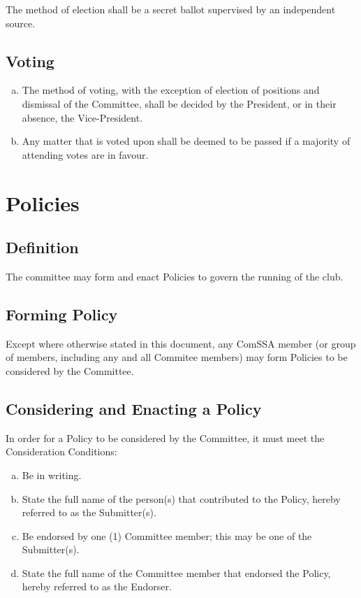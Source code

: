 \documentclass[a4paper,12pt]{article}
\begin{document}
The method of election shall be a secret ballot supervised by an independent source.

\subsection{Voting}

\begin{enumerate}[a)]
	\item The method of voting, with the exception of election of positions and dismissal of the Committee, shall be decided by the President, or in their absence, the Vice-President.
	\item Any matter that is voted upon shall be deemed to be passed if a majority of attending votes are in favour.
\end{enumerate}

\section{Policies}

\subsection{Definition}

The committee may form and enact Policies to govern the running of the club.

\subsection{Forming Policy}

Except where otherwise stated in this document, any ComSSA member (or group of members, including any and all Commitee members) may form Policies to be considered by the Committee.

\subsection{Considering and Enacting a Policy}

In order for a Policy to be considered by the Committee, it must meet the Consideration Conditions:

\begin{enumerate}[a)]
    \item Be in writing.
    \item State the full name of the person(s) that contributed to the Policy, hereby referred to as the Submitter(s).
    \item Be endorsed by one (1) Committee member; this may be one of the Submitter(s).
    \item State the full name of the Committee member that endorsed the Policy, hereby referred to as the Endorser.
\end{enumerate}
\end{document}
